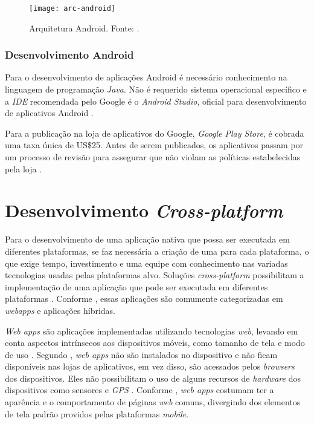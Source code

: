 \begin{figure}[h]
  \centering
    \texttt{[image: arc-android]}
    \caption[Arquitetura Android]{ Arquitetura Android. Fonte: \cite{android_android_2016}.}
	\label{fig:arc-android}
\end{figure}

\subsubsection{Desenvolvimento Android} \label{subsection:dev-android}

Para o desenvolvimento de aplicações Android é necessário conhecimento na linguagem de programação \textit{Java}.
Não é requerido sistema operacional específico e a \textit{IDE} recomendada pelo Google é o \textit{Android Studio}, oficial para desenvolvimento de aplicativos Android \cite{android_meet_2016}.

Para a publicação na loja de aplicativos do Google, \textit{Google Play Store}, é cobrada uma taxa única de US\$25. 
Antes de serem publicados, os aplicativos passam por um processo de revisão para assegurar que não violam as políticas estabelecidas pela loja \cite{meier_creating_2015}.  

\section{Desenvolvimento \textit{Cross-platform}} \label{section:desenvolvimentomulti}

Para o desenvolvimento de uma aplicação nativa que possa ser executada em diferentes plataformas, se faz necessária a criação de uma para cada plataforma, 
o que exige tempo, investimento e uma equipe com conhecimento nas variadas tecnologias usadas pelas plataformas alvo.
Soluções \textit{cross-platform} possibilitam a implementação de uma aplicação que pode ser executada em diferentes plataformas \cite{kassas_taxonomy_2015}. 
Conforme , essas aplicações são comumente categorizadas em \textit{webapps} e aplicações híbridas.

\textit{Web apps} são aplicações implementadas utilizando tecnologias \textit{web}, levando em conta aspectos intrínsecos aos dispositivos móveis, 
como tamanho de tela e modo de uso \cite{heitkotter_evaluating_2013}. Segundo , \textit{web apps} não são instalados 
no dispositivo e não ficam disponíveis nas lojas de aplicativos, em vez disso, são acessados pelos \textit{browsers} dos dispositivos. Eles 
não possibilitam o uso de alguns recursos de \textit{hardware} dos dispositivos como sensores e \textit{GPS} \cite{heitkotter_evaluating_2013}. 
Conforme , \textit{web apps} costumam ter a aparência e o comportamento de páginas \textit{web} comuns, 
divergindo dos elementos de tela padrão providos pelas plataformas \textit{mobile}.


